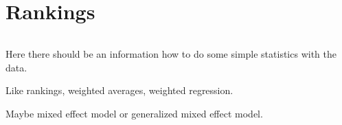 

\section{Rankings}

\begin{verbatim}

\end{verbatim}

 Here there should be an information how to do some simple statistics with the data.

Like rankings, weighted averages, weighted regression.

Maybe mixed effect model or generalized mixed effect model.

